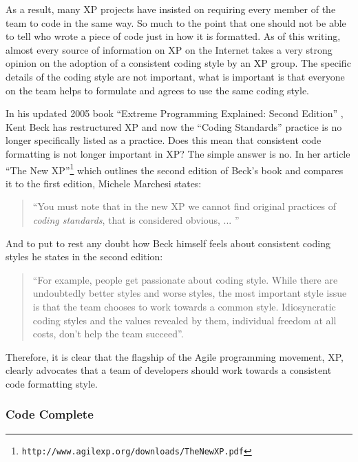 As a result, many XP projects have insisted on requiring every member of the
team to code in the same way.  So much to the point that one should not be
able to tell who wrote a piece of code just in how it is formatted.  As of
this writing, almost every source of information on XP on the Internet takes
a very strong opinion on the adoption of a consistent coding style by an XP
group.  The specific details of the coding style are not important, what is
important is that everyone on the team helps to formulate and agrees to use
the same coding style.

In his updated 2005 book ``Extreme Programming Explained: Second Edition''
{}\cite{ExtremeProgrammingExplained2nd04}, Kent Beck has restructured XP and
now the ``Coding Standards'' practice is no longer specifically listed as a
practice.  Does this mean that consistent code formatting is not longer
important in XP?  The simple answer is no.  In her article ``The New
XP''\footnote{ {}\texttt{http://www.agilexp.org/downloads/TheNewXP.pdf} }
which outlines the second edition of Beck's book and compares it to the first
edition, Michele Marchesi states:

\begin{quote}

``You must note that in the new XP we cannot find original practices of
{}\textit{coding standards}, that is considered obvious, ... ''

\end{quote}

And to put to rest any doubt how Beck himself feels about consistent coding
styles he states in the second edition:

\begin{quote}

``For example, people get passionate about coding style.  While there are
undoubtedly better styles and worse styles, the most important style issue is
that the team chooses to work towards a common style.  Idiosyncratic coding
styles and the values revealed by them, individual freedom at all costs, don't
help the team succeed''.

\end{quote}

Therefore, it is clear that the flagship of the Agile programming movement,
XP, clearly advocates that a team of developers should work towards a
consistent code formatting style.


%
\subsubsection{Code Complete}
%

